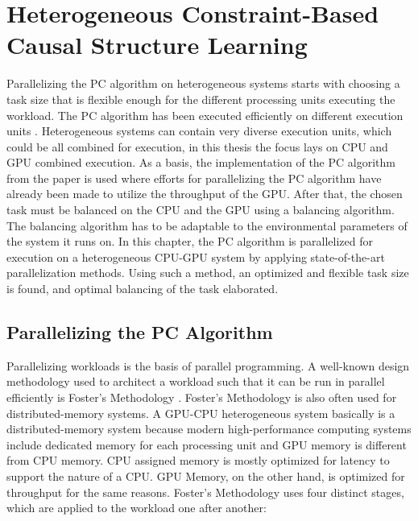 \chapter{Heterogeneous Constraint-Based Causal Structure Learning}
\label{chap:hetcsl}
Parallelizing the PC algorithm on heterogeneous systems starts with choosing a task size that is flexible enough for the different processing units executing the workload. The PC algorithm has been executed efficiently on different execution units \cite{leParallelPCPackageEfficient2018,leFastPCAlgorithm2019,schmidtOrderIndependentConstraintBasedCausal2018,zarebavaniCuPCCUDAbasedParallel2018}. Heterogeneous systems can contain very diverse execution units, which could be all combined for execution, in this thesis the focus lays on CPU and GPU combined execution. As a basis, the implementation of the PC algorithm from the paper \cite{schmidtOrderIndependentConstraintBasedCausal2018} is used where efforts for parallelizing the PC algorithm have already been made to utilize the throughput of the GPU. After that, the chosen task must be balanced on the CPU and the GPU using a balancing algorithm. The balancing algorithm has to be adaptable to the environmental parameters of the system it runs on. In this chapter, the PC algorithm is parallelized for execution on a heterogeneous CPU-GPU system by applying state-of-the-art parallelization methods. Using such a method, an optimized and flexible task size is found, and optimal balancing of the task elaborated.

\section{Parallelizing the PC Algorithm}
Parallelizing workloads is the basis of parallel programming. A well-known design methodology used to architect a workload such that it can be run in parallel efficiently is Foster's Methodology \cite{fosterDesigningBuildingParallel1995}. Foster's Methodology is also often used for distributed-memory systems. A GPU-CPU heterogeneous system basically is a distributed-memory system because modern high-performance computing systems include dedicated memory for each processing unit and GPU memory is different from CPU memory. CPU assigned memory is mostly optimized for latency to support the nature of a CPU. GPU Memory, on the other hand, is optimized for throughput for the same reasons. Foster's Methodology uses four distinct stages, which are applied to the workload one after another:

